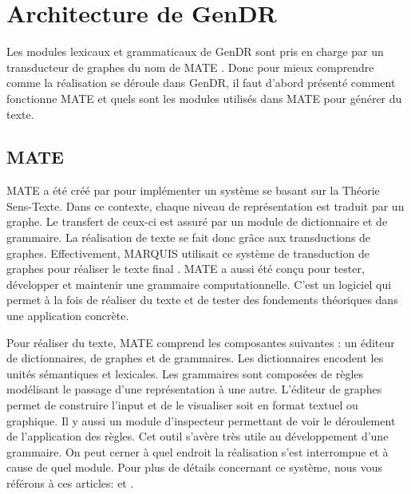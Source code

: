 
\section{Architecture de GenDR}

Les modules lexicaux et grammaticaux de GenDR sont pris en charge par un transducteur de graphes du nom de MATE \citep{BohnetDevelopmentEnvironmentMTTbased2000}. Donc pour mieux comprendre comme la réalisation se déroule dans GenDR, il faut d'abord présenté comment fonctionne MATE et quels sont les modules utilisés dans MATE pour générer du texte.

\subsection{MATE}
MATE a été créé par \cite{BohnetDevelopmentEnvironmentMTTbased2000} pour implémenter un système se basant sur la Théorie Sens-Texte. Dans ce contexte, chaque niveau de représentation est traduit par un graphe. Le transfert de ceux-ci est assuré par un module de dictionnaire et de grammaire. La réalisation de texte se fait donc grâce aux transductions de graphes. Effectivement, MARQUIS utilisait ce système de transduction de graphes pour réaliser le texte final \citep{Lareau2007TowardsAG}. MATE a aussi été conçu pour tester, développer et maintenir une grammaire computationnelle. C'est un logiciel qui permet à la fois de réaliser du texte et de tester des fondements théoriques dans une application concrète. 

Pour réaliser du texte, MATE comprend les composantes suivantes : un éditeur de dictionnaires, de graphes et de grammaires. Les dictionnaires encodent les unités sémantiques et lexicales. Les grammaires sont composées de règles modélisant le passage d'une représentation à une autre. L'éditeur de graphes permet de construire l'input et de le visualiser soit en format textuel ou graphique. Il y aussi un module d'inspecteur permettant de voir le déroulement de l'application des règles. Cet outil s'avère très utile au développement d'une grammaire. On peut cerner à quel endroit la réalisation s'est interrompue et à cause de quel module. Pour plus de détails concernant ce système, nous vous référons à ces articles: \citep{BohnetOpensourcegraph2010} et \citep{LambreyImplementationcollocationspour2017}.

